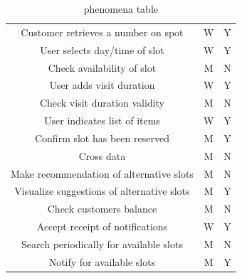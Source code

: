 \documentclass[table, 12pt]{article}
\begin{document}
\begin{center}
\begin{table}
\begin{tabularx}{\textwidth}{| c| c| c|}
            Customer retrieves a number on spot        & W                & Y          \\
            User selects day/time of slot              & W                & Y          \\
            Check availability of slot                 & M                & N          \\
            User adds visit duration                   & W                & Y          \\
            Check visit duration validity              & M                & N          \\
            User indicates list of items               & W                & Y          \\
            Confirm slot has been reserved             & M                & Y          \\
            Cross data                                 & M                & N          \\
            Make recommendation of alternative slots   & M                & N          \\
            Visualize suggestions of alternative slots & M                & Y          \\
            Check customers balance                    & M                & N          \\
            Accept receipt of notifications            & W                & Y          \\
            Search periodically for available slots    & M                & N          \\
            Notify for available slots                 & M                & Y          \\

            \hline
        \end{tabularx}
        \caption{phenomena table}
    \end{table}
\end{center}
\newpage
\end{document}
